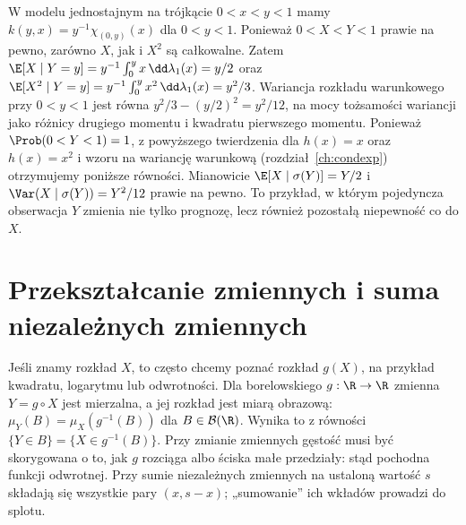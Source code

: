 \begin{przyklad}
W modelu jednostajnym na trójkącie $0<x<y<1$
mamy $k(y,x)=y^{-1}\chi_{(0,y)}(x)$ dla $0<y<1$.
Ponieważ $0<X<Y<1$ prawie na pewno, zarówno $X$, jak i $X^2$
są całkowalne.
Zatem
$\E[X\mid Y=y]=y^{-1}\int_0^y x\,\dd\lambda_1(x)=y/2$
oraz
$\E[X^2\mid Y=y]=y^{-1}\int_0^y x^2\,\dd\lambda_1(x)=y^2/3$.
Wariancja rozkładu warunkowego przy $0<y<1$ jest równa
$y^2/3-(y/2)^2=y^2/12$, na mocy tożsamości wariancji
jako różnicy drugiego momentu i kwadratu pierwszego momentu.
Ponieważ $\Prob(0<Y<1)=1$, z powyższego twierdzenia dla
$h(x)=x$ oraz $h(x)=x^2$ i wzoru na wariancję warunkową
(rozdział~\ref{ch:condexp}) otrzymujemy poniższe równości.
Mianowicie $\E[X\mid\sigma(Y)]=Y/2$ i
$\Var(X\mid\sigma(Y))=Y^2/12$ prawie na pewno.
To przykład, w którym pojedyncza obserwacja $Y$
zmienia nie tylko prognozę, lecz również pozostałą
niepewność co do $X$.
\end{przyklad}

\section{Przekształcanie zmiennych i suma niezależnych zmiennych}
Jeśli znamy rozkład $X$, to często chcemy poznać rozkład
$g(X)$, na przykład kwadratu, logarytmu lub odwrotności.
Dla borelowskiego $g:\R\to\R$ zmienna $Y=g\circ X$ jest
mierzalna, a jej rozkład jest miarą obrazową:
$\mu_Y(B)=\mu_X(g^{-1}(B))$ dla $B\in\mathcal B(\R)$.
Wynika to z równości $\{Y\in B\}=\{X\in g^{-1}(B)\}$.
Przy zmianie zmiennych gęstość musi być skorygowana o to,
jak $g$ rozciąga albo ściska małe przedziały: stąd pochodna
funkcji odwrotnej. Przy sumie niezależnych zmiennych na
ustaloną wartość $s$ składają się wszystkie pary $(x,s-x)$;
„sumowanie” ich wkładów prowadzi do splotu.

